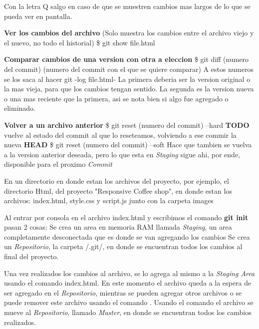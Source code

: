 \documentclass[]{article} %
\begin{document}
\begin{center}
	Con la letra Q salgo en caso de que se muestren cambios mas largos de lo que se pueda ver en pantalla.

	\textbf{Ver los cambios del archivo}
	(Solo muestra los cambios entre el archivo viejo y el nuevo, no todo el historial)
	\$ git show file.html

	\textbf{Comparar cambios de una version con otra a eleccion}
	\$ git diff (numero del commit) (numero del commit con el que se quiere comparar)
	A estos numeros se los saca al hacer git -log file.html-
	La primera deberia ser la version original o la mas vieja, para que los cambios tengan sentido.
	La segunda es la version nueva o una mas reciente que la primera, asi se nota bien si algo fue agregado o eliminado.


	\textbf{Volver a un archivo anterior}
	\$ git reset (numero del commit) --hard \textbf{TODO} vuelve al estado del commit al que lo reseteamos, volviendo a ese commir la nueva \textbf{HEAD}
	\$ git reset (numero del commit) --soft Hace que tambien se vuelva a la version anterior deseada, pero lo que esta en \textit{Staging} sigue ahi, por ende, disponible para el proximo \textit{Commit}




\end{center}



En un directorio en donde estan los archivos del proyecto, por ejemplo, el directorio Html, del proyecto "Responsive Coffee shop", en donde estan los archivos: index.html, style.css y script.js junto con la carpeta images

Al entrar por consola en el archivo index.html y escribimos el comando \textbf{git init} pasan 2 cosas:
Se crea un area en memoria RAM llamada \textit{Staging}, un area completamente desconectada que es donde se van agregando los cambios
Se crea un \textit{Repositorio}, la carpeta /.git/, en donde se encuentran todos los cambios al final del proyecto.

Una vez realizados los cambios al archivo, se lo agrega al mismo a la \textit{Staging Area} usando el comando  index.html. En este momento el archivo queda a la espera de ser agregado en el \textit{Repositorio}, mientras se pueden agregar otros archivos o se puede remover este archivo usando el comando .
Usando el comando  el archivo se mueve al \textit{Repositorio}, llamado \textit{Master}, en donde se encuentran todos los cambios realizados.
\end{document}
